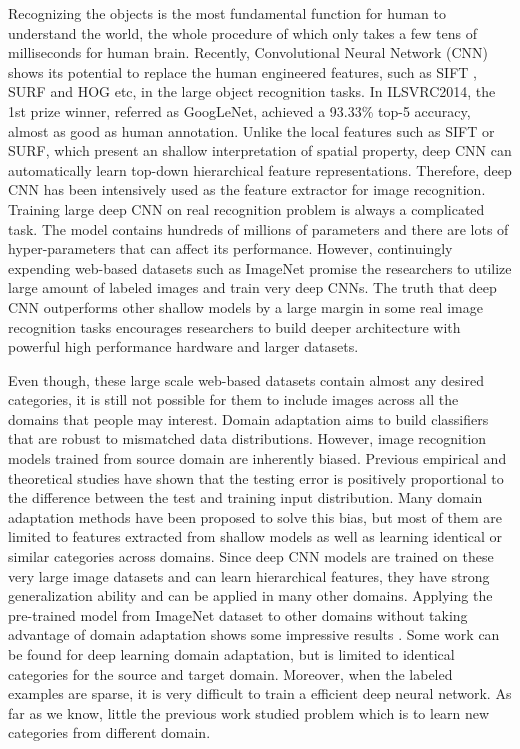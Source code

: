 ﻿Recognizing the objects is the most fundamental function for human to understand the world, the whole procedure of which only takes a few tens of milliseconds for human brain.
Recently, Convolutional Neural Network (CNN) shows its potential to replace the human engineered features, such as SIFT \cite{lowe1999object}, SURF \cite{bay2006surf} and HOG \cite{dalal2005histograms} etc, in the large object recognition tasks\cite{krizhevsky2012imagenet}\cite{zeiler2014visualizing}\cite{simonyan2014very}. In ILSVRC2014, the 1st prize winner, referred as GoogLeNet, achieved a 93.33\% top-5 accuracy, almost as good as human annotation\cite{szegedy2014going}.
Unlike the local features such as SIFT or SURF, which present an shallow interpretation of spatial property, deep CNN can automatically learn top-down hierarchical feature representations. Therefore, deep CNN has been intensively used as the feature extractor for image recognition\cite{farabet2013learning}.
Training large deep CNN on real recognition problem is always a complicated task. The model contains hundreds of millions of parameters and there are lots of hyper-parameters that can affect its performance. However, continuingly expending web-based datasets such as ImageNet promise the researchers to utilize large amount of labeled images and train very deep CNNs. The truth that deep CNN outperforms other shallow models by a large margin in some real image recognition tasks encourages researchers to build deeper architecture with powerful high performance hardware and larger datasets.

Even though, these large scale web-based datasets contain almost any desired categories, it is still not possible for them to include images across all the domains that people may interest.
Domain adaptation aims to build classifiers that are robust to mismatched data distributions. However, image recognition models trained from source domain are inherently biased. Previous empirical and theoretical studies have shown that the testing error is positively proportional to the difference between the test and training input distribution\cite{ben2007analysis}\cite{blitzer2008learning}. Many domain adaptation methods have been proposed to solve this bias, but most of them are limited to features extracted from shallow models as well as learning identical or similar categories across domains\cite{daume2009frustratingly}\cite{yang2007adapting}\cite{aytar2011tabula}.
Since deep CNN models are trained on these very large image datasets and can learn hierarchical features, they have strong generalization ability and can be applied in many other domains. Applying the pre-trained model from ImageNet dataset to other domains without taking advantage of domain adaptation shows some impressive results\cite{Chatfield14} \cite{zeiler2014visualizing}. Some work can be found for deep learning domain adaptation, but is limited to identical categories for the source and target domain\cite{hoffman2013one}\cite{NIPS2014_Zhou}. Moreover, when the labeled examples are sparse, it is very difficult to train a efficient deep neural network. As far as we know, little the previous work studied problem which is to learn new categories from different domain.

